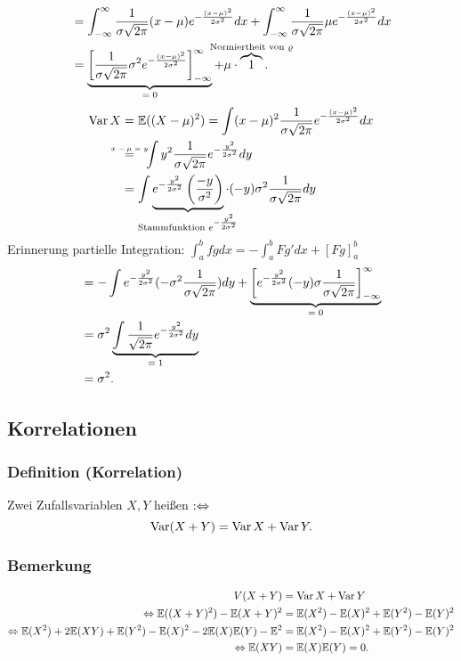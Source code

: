 {\begin{align*}
&=\int_{-\infty}^{\infty}\frac{1}{\sigma\sqrt{2\pi}}(x-\mu)e^{-\frac{(x-\mu)^2}{2\sigma^2}}dx
+\int_{-\infty}^{\infty}\frac{1}{\sigma\sqrt{2\pi}}\mu e^{-\frac{(x-\mu)^2}{2\sigma^2}}dx\\
&=\ubr{\left[\frac{1}{\sigma\sqrt{2\pi}}\sigma^2e^{-\frac{(x-\mu)^2}{2\sigma^2}}\right]_{-\infty}^\infty}{$=0$}
+\mu\cdot\obr{1}{Normiertheit von $\varrho$}.
\end{align*}
\begin{align*}
\Var X&=\mathbb{E}((X-\mu)^2)=\int(x-\mu)^2\frac{1}{\sigma\sqrt{2\pi}}e^{-\frac{(x-\mu)^2}{2\sigma^2}}dx\\
&\textabove{$x-\mu=y$}{=}\ \ \int y^2\frac{1}{\sigma\sqrt{2\pi}}e^{-\frac{y^2}{2\sigma^2}}dy\\
&=\int \ubr{e^{-\frac{y^2}{2\sigma^2}}\left(\frac{-y}{\sigma^2}\right)}{Stammfunktion $e^{-\frac{y^2}{2\sigma^2}}$}\cdot(-y)\sigma^2\frac{1}{\sigma\sqrt{2\pi}}dy\\
\end{align*}
Erinnerung partielle Integration: $\int_a^bfgdx=-\int_a^bFg'dx+[Fg]_a^b$
\begin{align*}
&=-\int e^{-\frac{y^2}{2\sigma^2}}(-\sigma^2\frac{1}{\sigma\sqrt{2\pi}})dy
+\ubr{\left[e^{-\frac{y^2}{2\sigma^2}}(-y)\sigma\frac{1}{\sigma\sqrt{2\pi}}\right]_{-\infty}^\infty}{$=0$}\\
&=\sigma^2\ubr{\int\frac{1}{\sqrt{2\pi}}e^{-\frac{y^2}{2\sigma^2}}dy}{$=1$}\\
&=\sigma^2.
\end{align*}
}
\subsection{Korrelationen}
\subsubsection{Definition (Korrelation)}
Zwei Zufallsvariablen $X,Y$ hei\ss{}en  $:\Leftrightarrow$
\[
\operatorname{Var}(X+Y)=\operatorname{Var} X+\operatorname{Var} Y.
\]
\subsubsection{Bemerkung}
\begin{align*}
V(X+Y)&=\operatorname{Var} X+\operatorname{Var} Y\\
\Leftrightarrow\mathbb{E}((X+Y)^2)-\mathbb{E}(X+Y)^2&=\mathbb{E}(X^2)-\mathbb{E}(X)^2+\mathbb{E}(Y^2)-\mathbb{E}(Y)^2\\
\Leftrightarrow\mathbb{E}(X^2)+2\mathbb{E}(XY)+\mathbb{E}(Y^2)-\mathbb{E}(X)^2-2\mathbb{E}(X)\mathbb{E}(Y)-\mathbb{E}^2&=\mathbb{E}(X^2)-\mathbb{E}(X)^2+\mathbb{E}(Y^2)-\mathbb{E}(Y)^2\\
\Leftrightarrow\mathbb{E}(XY)&=\mathbb{E}(X)\mathbb{E}(Y)=0.
\end{align*}
